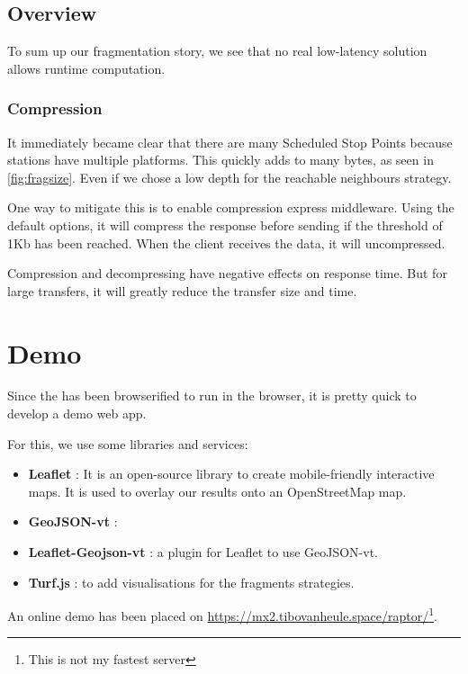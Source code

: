\subsection{Overview}

To sum up our fragmentation story, we see that no real low-latency solution allows runtime computation. 
\subsubsection{Compression}
It immediately became clear that there are many Scheduled Stop Points because stations have multiple platforms. This quickly adds to many bytes, as seen in \autoref{fig:fragsize}. Even if we chose a low depth for the reachable neighbours strategy.

One way to mitigate this is to enable compression express middleware\cite{noauthor_compression_2019}. Using the default options, it will compress the response before sending if the threshold of 1Kb has been reached. When the client receives the data, it will uncompressed. 

Compression and decompressing have negative effects on response time. But for large transfers, it will greatly reduce the transfer size and time. 

\section{Demo}
Since the  has been browserified to run in the browser, it is pretty quick to develop a demo web app.

For this, we use some libraries and services:
\begin{itemize}
    \item \textbf{Leaflet} \cite{noauthor_leaflet_nodate}: It is an open-source library to create mobile-friendly interactive maps. It is used to overlay our results onto an OpenStreetMap map. 
    \item \textbf{GeoJSON-vt} \cite{noauthor_mapboxgeojson-vt_2024}: 
    \item \textbf{Leaflet-Geojson-vt} \cite{kshetri_iamteksonleaflet-geojson-vt_2024}: a plugin for Leaflet to use GeoJSON-vt.
    \item \textbf{Turf.js} \cite{noauthor_turfjs_nodate}: to add visualisations for the fragments strategies.
\end{itemize}

An online demo has been placed on \url{https://mx2.tibovanheule.space/raptor/}\footnote{This is not my fastest server}.
